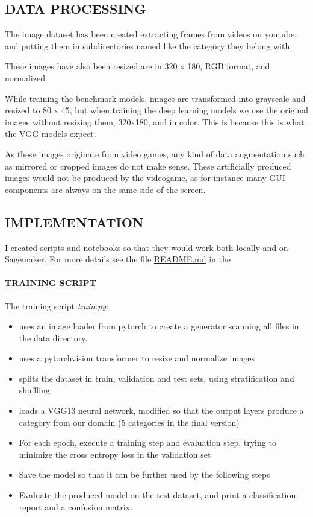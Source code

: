 \documentclass[
]{article}
\providecommand{\tightlist}{%
  \setlength{\itemsep}{0pt}\setlength{\parskip}{0pt}}
\newcommand{\hhref}[3][blue]{\href{#2}{\color{#1}{#3}}}%
\begin{document}
\hypertarget{data-processing}{%
\subsection{DATA PROCESSING}\label{data-processing}}

The image dataset has been created extracting frames from videos on
youtube, and putting them in subdirectories named like the category they
belong with. 

These images have also been resized are in 320 x 180, RGB format, and
normalized.

While training the benchmark models, images are transformed into
grayscale and resized to 80 x 45, but when training the deep learning
models we use the original images without resizing them, 320x180, and in color. 
This is because this is what the VGG models expect.

As these images originate from video games, any kind of data
augmentation such as mirrored or cropped images do not make sense. These artificially produced 
images would not be produced by the videogame, as for instance many GUI components are
always on the same side of the screen.

\hypertarget{implementation}{%
\subsection{IMPLEMENTATION}\label{implementation}}

I created scripts and notebooks so that they would work both locally and
on Sagemaker. For more details see the file \url{README.md} in the \hhref{https://github.com/diegoami/DA_ML_Capstone}{Github repository}

\hypertarget{training-script}{%
\paragraph{TRAINING SCRIPT}\label{training-script}}

The training script \emph{train.py}:

\begin{itemize}
\tightlist
\item
  uses an image loader from pytorch to create a generator scanning all
  files in the data directory.
\item
  uses a pytorchvision transformer to resize and normalize images
\item
  splits the dataset in train, validation and test sets, using
  stratification and shuffling
\item
  loads a VGG13 neural network, modified so that the output layers produce
  a category from our domain (5 categories in the final version)
\item
  For each epoch, execute a training step and evaluation step, trying to
  minimize the cross entropy loss in the validation set
\item
  Save the model so that it can be further used by the following steps
\item
  Evaluate the produced model on the test dataset, and print a
  classification report and a confusion matrix.
\end{itemize}
\end{document}
